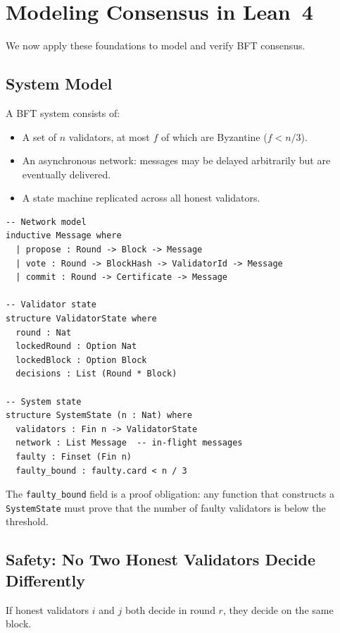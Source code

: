 \section{Modeling Consensus in Lean~4}


We now apply these foundations to model and verify BFT consensus.

\subsection{System Model}

\begin{definition}
A BFT system consists of:
\begin{itemize}[nosep]
  \item A set of $n$ validators, at most $f$ of which are Byzantine ($f < n/3$).
  \item An asynchronous network: messages may be delayed arbitrarily but are eventually delivered.
  \item A state machine replicated across all honest validators.
\end{itemize}
\end{definition}

\begin{lstlisting}[language=Lean,caption={BFT system model in Lean~4}]
-- Network model
inductive Message where
  | propose : Round -> Block -> Message
  | vote : Round -> BlockHash -> ValidatorId -> Message
  | commit : Round -> Certificate -> Message

-- Validator state
structure ValidatorState where
  round : Nat
  lockedRound : Option Nat
  lockedBlock : Option Block
  decisions : List (Round * Block)

-- System state
structure SystemState (n : Nat) where
  validators : Fin n -> ValidatorState
  network : List Message  -- in-flight messages
  faulty : Finset (Fin n)
  faulty_bound : faulty.card < n / 3
\end{lstlisting}

The \texttt{faulty\_bound} field is a proof obligation: any function that constructs a
\texttt{SystemState} must prove that the number of faulty validators is below the
threshold.

\subsection{Safety: No Two Honest Validators Decide Differently}

\begin{theorem}
If honest validators $i$ and $j$ both decide in round $r$, they decide on the same block.
\end{theorem}

